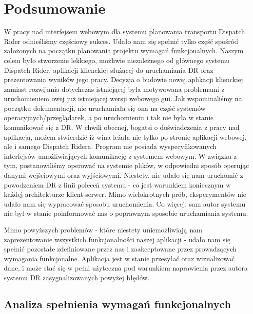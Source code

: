 \chapter{Podsumowanie}

W pracy nad interfejsem webowym dla systemu planowania transportu Dispatch Rider odnieśliśmy częściowy sukces. Udało nam się spełnić tylko część spośród założonych na początku planowania projektu wymagań funkcjonalnych. 
Naszym celem było stworzenie lekkiego, możliwie niezależnego od głównego systemu Dispatch Rider, aplikacji klienckiej służącej do uruchamiania DR oraz prezentowania wyników jego pracy. Decyzja o budowie nowej aplikacji klienckiej zamiast rozwijania dotychczas istniejącej była motywowana problemami z uruchomieniem owej już istniejącej wersji webowego gui. Jak wspominaliśmy na początku dokumentacji, nie uruchamiała się ona na część systemów operacyjnych/przeglądarek, a po uruchomieniu i tak nie była w stanie komunikować się z DR.
W chwili obecnej, bogatsi o doświadczenia z pracy nad aplikacją, możem stwierdzić iż wina leżała nie tylko po stronie aplikacji webowej, ale i samego Dispatch Ridera.
Program nie posiada wyspecyfikowanych interfejsów umożliwiających komunikację z systemem webowym. W związku z tym, postanowiliśmy operować na systemie plików, w odpowiedni sposób operując danymi wejściowymi oraz wyjściowymi.
Niestety, nie udało się nam uruchomić z powodzeniem DR z linii poleceń systemu - co jest warunkiem koniecznym w każdej architekturze klient-serwer. Mimo wielokrotnych prób, eksperymentów nie udało nam się wypracować sposobu uruchomienia. Co więcej, sam autor systemu nie był w stanie poinformować nas o poprawnym sposobie uruchamiania systemu. 

Mimo powyższych problemów - które niestety uniemożliwiają nam zaprezentowanie wszystkich funkcjonalności naszej aplikacji - udało nam się spełnić pozostałe zdefiniowane przez nas i zaakceptowane przez prowadzących wymagania funkcjonalne. Aplikacja jest w stanie przesyłać oraz wizualizować dane, i może stać się w pełni użyteczna pod warunkiem naprawienia przez autora systemu DR zasygnalizowanych powyżej błędów.
\vfill \hfill
\newpage

\section{Analiza spełnienia wymagań funkcjonalnych}

